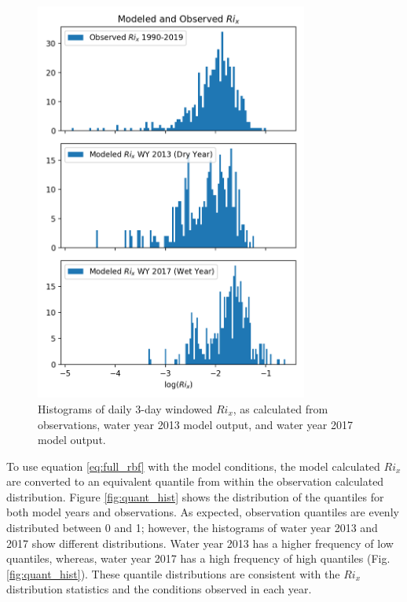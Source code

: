 \documentclass[preprint,review,12pt]{elsarticle}
\begin{document}
\begin{figure}[ht!]
\centering
\includegraphics[width=0.8\textwidth]{Figures/rix_hist.png}
\caption{Histograms of daily 3-day windowed \(Ri_x\), as calculated from observations, water year 2013 model output, and water year 2017 model output.}
\label{fig:rix_hist}
\end{figure}
\FloatBarrier

To use equation \ref{eq:full_rbf} with the model conditions, the model calculated \(Ri_x\) are converted to an equivalent quantile from within the observation calculated distribution. Figure \ref{fig:quant_hist} shows the distribution of the quantiles for both model years and observations. As expected, observation quantiles are evenly distributed between 0 and 1; however, the histograms of water year 2013 and 2017 show different distributions. Water year 2013 has a higher frequency of low quantiles, whereas, water year 2017 has a high frequency of high quantiles (Fig. \ref{fig:quant_hist}). These quantile distributions are consistent with the \(Ri_x\) distribution statistics and the conditions observed in each year. 
\end{document}

